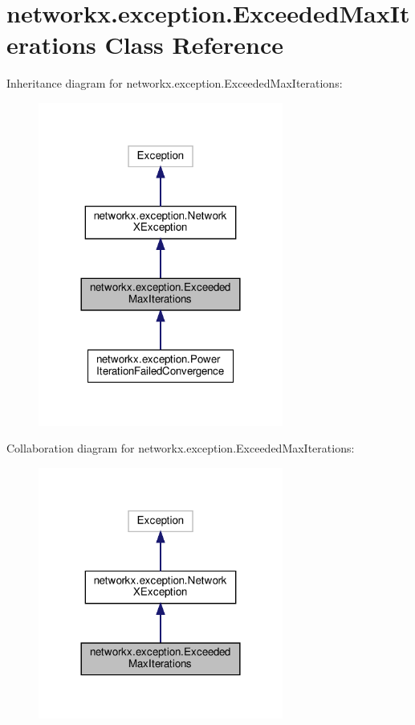 \hypertarget{classnetworkx_1_1exception_1_1ExceededMaxIterations}{}\section{networkx.\+exception.\+Exceeded\+Max\+Iterations Class Reference}
\label{classnetworkx_1_1exception_1_1ExceededMaxIterations}


Inheritance diagram for networkx.\+exception.\+Exceeded\+Max\+Iterations\+:
\nopagebreak
\begin{figure}[H]
\begin{center}
\leavevmode
\includegraphics[width=228pt]{classnetworkx_1_1exception_1_1ExceededMaxIterations__inherit__graph}
\end{center}
\end{figure}


Collaboration diagram for networkx.\+exception.\+Exceeded\+Max\+Iterations\+:
\nopagebreak
\begin{figure}[H]
\begin{center}
\leavevmode
\includegraphics[width=228pt]{classnetworkx_1_1exception_1_1ExceededMaxIterations__coll__graph}
\end{center}
\end{figure}


